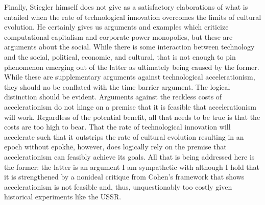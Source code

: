 \documentclass[letterpaper,notitlepage,12pt]{article}
\begin{document}
Finally, Stiegler himself does not give as a satisfactory elaborations of what
is entailed when the rate of technological innovation overcomes the limits of
cultural evolution.
He certainly gives us arguments and examples which criticize computational
capitalism and corporate power monopolies, but these are arguments about the
social.
While there is some interaction between technology and the social, political,
economic, and cultural, that is not enough to pin phenomenon emerging out of the
latter as ultimately being caused by the former.
While these are supplementary arguments against technological accelerationism,
they should no be conflated with the time barrier argument.
The logical distinction should be evident.
Arguments against the reckless costs of accelerationism do not hinge on a
premise that it is feasible that accelerationism will work.
Regardless of the potential benefit, all that needs to be true is that the costs
are too high to bear.
That the rate of technological innovation will accelerate such that it outstrips
the rate of cultural evolution resulting in an epoch without epokh\={e},
however, does logically rely on the premise that accelerationism can feasibly
achieve its goals.
All that is being addressed here is the former: the latter is an argument I am
sympathetic with although I hold that it is strengthened by a nonideal critique
from Cohen's framework that shows accelerationism is not feasible and, thus,
unquestionably too costly given historical experiments like the USSR.
\end{document}
